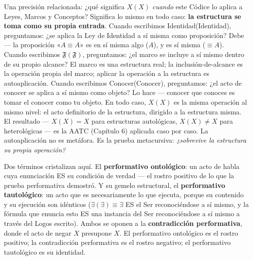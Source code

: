 \documentclass[10pt, openany, oneside]{book}
\begin{document}
Una precisión relacionada: ¿qué significa $X(X)$ \textit{cuando} este Códice lo aplica a Leyes, Marcos y Conceptos? Significa lo mismo en todo caso: \textbf{la estructura se toma como su propia entrada}. Cuando escribimos Identidad(Identidad), preguntamos: ¿se aplica la Ley de Identidad a sí misma como proposición? Debe --- la proposición «$A \equiv A$» es en sí misma algo ($A$), y es sí misma ($\equiv A$). Cuando escribimos $\mathfrak{F}(\mathfrak{F})$, preguntamos: ¿el marco se incluye a sí mismo dentro de su propio alcance? El marco es una estructura real; la inclusión-de-alcance es la operación propia del marco; aplicar la operación a la estructura es autoaplicación. Cuando escribimos Conocer(Conocer), preguntamos: ¿el acto de conocer se aplica a sí mismo como objeto? Lo hace --- conocer que conoces es tomar el conocer como tu objeto. En todo caso, $X(X)$ es la misma operación al mismo nivel: el acto definitorio de la estructura, dirigido a la estructura misma. El resultado --- $X(X) = X$ para estructuras autológicas, $X(X) \neq X$ para heterológicas --- es la AATC (Capítulo 6) aplicada caso por caso. La autoaplicación no es metáfora. Es la prueba metacursiva: \textit{¿sobrevive la estructura su propia operación?}

Dos términos cristalizan aquí. El \textbf{performativo ontológico}: un acto de habla cuya enunciación ES su condición de verdad --- el rostro positivo de lo que la prueba performativa demostró. Y su gemelo estructural, el \textbf{performativo tautológico}: un acto que es necesariamente lo que ejecuta, porque su contenido y su ejecución son idénticos ($\exists(\exists) \equiv \exists$ ES el Ser reconociéndose a sí mismo, y la fórmula que enuncia esto ES una instancia del Ser reconociéndose a sí mismo a través del Logos escrito). Ambos se oponen a la \textbf{contradicción performativa}, donde el acto de negar $X$ presupone $X$. El performativo ontológico es el rostro positivo; la contradicción performativa es el rostro negativo; el performativo tautológico es su identidad.
\end{document}
